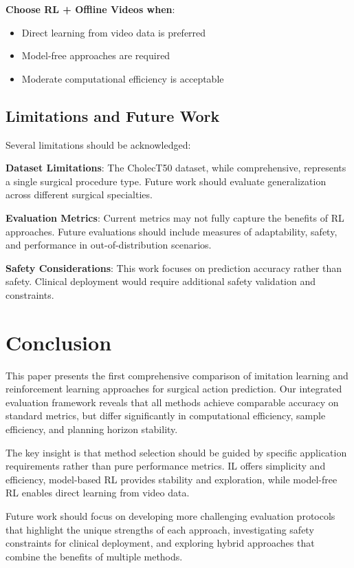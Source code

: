 \documentclass[conference]{IEEEtran}
\begin{document}
\textbf{Choose RL + Offline Videos when}:
\begin{itemize}
\item Direct learning from video data is preferred
\item Model-free approaches are required
\item Moderate computational efficiency is acceptable
\end{itemize}

\subsection{Limitations and Future Work}

Several limitations should be acknowledged:

\textbf{Dataset Limitations}: The CholecT50 dataset, while comprehensive, represents a single surgical procedure type. Future work should evaluate generalization across different surgical specialties.

\textbf{Evaluation Metrics}: Current metrics may not fully capture the benefits of RL approaches. Future evaluations should include measures of adaptability, safety, and performance in out-of-distribution scenarios.

\textbf{Safety Considerations}: This work focuses on prediction accuracy rather than safety. Clinical deployment would require additional safety validation and constraints.

\section{Conclusion}

This paper presents the first comprehensive comparison of imitation learning and reinforcement learning approaches for surgical action prediction. Our integrated evaluation framework reveals that all methods achieve comparable accuracy on standard metrics, but differ significantly in computational efficiency, sample efficiency, and planning horizon stability.

The key insight is that method selection should be guided by specific application requirements rather than pure performance metrics. IL offers simplicity and efficiency, model-based RL provides stability and exploration, while model-free RL enables direct learning from video data.

Future work should focus on developing more challenging evaluation protocols that highlight the unique strengths of each approach, investigating safety constraints for clinical deployment, and exploring hybrid approaches that combine the benefits of multiple methods.
\end{document}
